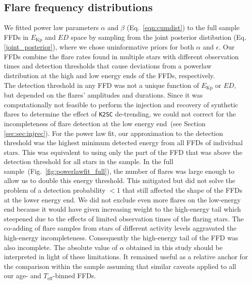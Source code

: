\documentclass{aa}
\begin{document}
\subsection{Flare frequency distributions}
We fitted power law parameters $\alpha$ and $\beta$ (Eq.~\ref{eqn:cumdist}) to the full sample FFDs in $E_\mathrm{Kp}$ and $ED$ space by sampling from the joint posterior distibution (Eq. \ref{joint_posterior}), where we chose uninformative priors for both $\alpha$ and $\epsilon$. Our FFDs combine the flare rates found in multiple stars with different observation times and detection thresholds that cause deviations from a powerlaw distribution at the high and low energy ends of the FFDs, respectively.
\\
The detection threshold in any FFD was not a unique function of $E_\mathrm{Kp}$ or $ED$, but depended on the flares' amplitudes and durations. Since it was computationally not feasible to perform the injection and recovery of synthetic flares to determine the effect of \texttt{K2SC} de-trending, we could not correct for the incompleteness of flare detection at the low energy end~(see Section \ref{sec:sec:injrec}). For the power law fit, our approximation to the detection threshold was the highest minimum detected energy from all FFDs of individual stars. This was equivalent to using only the part of the FFD that was above the detection threshold for all stars in the sample. In the full sample~(Fig.~\ref{fig:powerlawfit_full}), the number of flares was large enough to allow us to double this energy threshold. This mitigated but did not solve the problem of a detection probability $<1$ that still affected the shape of the FFDs at the lower energy end. We did not exclude even more flares on the low-energy end because it would have given increasing weight to the high-energy tail which steepened due to the effects of limited observation times of the flaring stars. The co-adding of flare samples from stars of different activity levels aggravated the high-energy incompleteness. Consequently the high-energy tail of the FFD was also incomplete. 
The absolute value of $\alpha$ obtained in this study should be interpreted in light of these limitations. It remained useful as a relative anchor for the comparison within the sample assuming that similar caveats applied to all our age- and $T_\mathrm{eff}$-binned FFDs.
\end{document}
